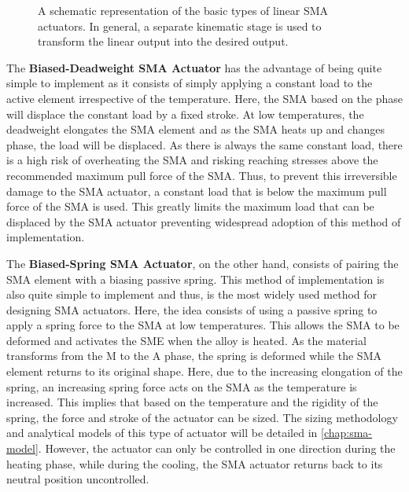 \begin{figure}[hbt!]
    \centering
    
    \caption{A schematic representation of the basic types of linear SMA actuators. In general, a separate kinematic stage is used to transform the linear output into the desired output.}
    \label{fig:sma-actuators-diagram}
\end{figure}
The \textbf{Biased-Deadweight SMA Actuator} has the advantage of being quite simple to implement as it consists of simply applying a constant load to the active element irrespective of the temperature. Here, the SMA based on the phase will displace the constant load by a fixed stroke. At low temperatures, the deadweight elongates the SMA element and as the SMA heats up and changes phase, the load will be displaced. As there is always the same constant load, there is a high risk of overheating the SMA and risking reaching stresses above the recommended maximum pull force of the SMA. Thus, to prevent this irreversible damage to the SMA actuator, a constant load that is below the maximum pull force of the SMA is used. This greatly limits the maximum load that can be displaced by the SMA actuator preventing widespread adoption of this method of implementation.

The \textbf{Biased-Spring SMA Actuator}, on the other hand, consists of pairing the SMA element with a biasing passive spring. This method of implementation is also quite simple to implement and thus, is the most widely used method for designing SMA actuators. Here, the idea consists of using a passive spring to apply a spring force to the SMA at low temperatures. This allows the SMA to be deformed and activates the SME when the alloy is heated. As the material transforms from the M to the A phase, the spring is deformed while the SMA element returns to its original shape. Here, due to the increasing elongation of the spring, an increasing spring force acts on the SMA as the temperature is increased. This implies that based on the temperature and the rigidity of the spring, the force and stroke of the actuator can be sized. The sizing methodology and analytical models of this type of actuator will be detailed in \cref{chap:sma-model}. However, the actuator can only be controlled in one direction during the heating phase, while during the cooling, the SMA actuator returns back to its neutral position uncontrolled.


